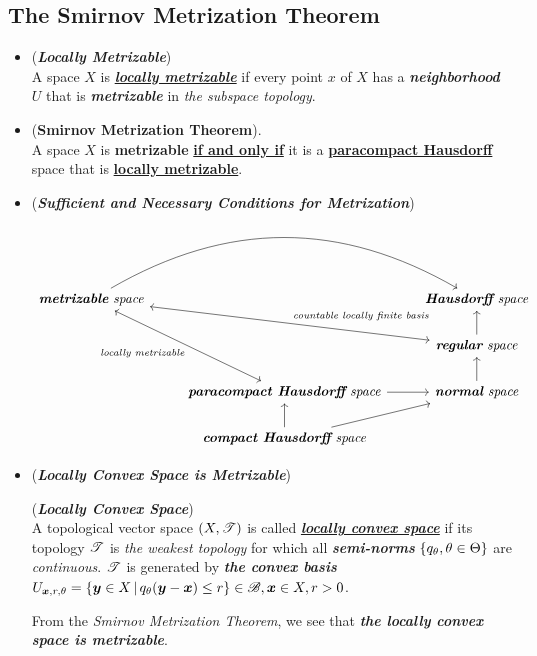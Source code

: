 \documentclass[11pt]{article}
\begin{document}
\subsection{The Smirnov Metrization Theorem}
\begin{itemize}
\item \begin{definition} (\emph{\textbf{Locally Metrizable}})\\
A space $X$ is \underline{\emph{\textbf{locally metrizable}}} if every point $x$ of $X$ has a \emph{\textbf{neighborhood}} $U$ that is \emph{\textbf{metrizable}} in \emph{the subspace topology}.
\end{definition}

\item \begin{theorem} (\textbf{Smirnov Metrization Theorem}).  \citep{munkres2000topology}\\
A space $X$ is \textbf{metrizable} \underline{\textbf{if and only if}} it is a \underline{\textbf{paracompact Hausdorff}} space that is \underline{\textbf{locally metrizable}}.
\end{theorem}

\item 
\begin{remark} (\emph{\textbf{Sufficient and Necessary Conditions for Metrization}})
\[
  \begin{tikzcd}
   \text{\emph{\textbf{metrizable} space}} \arrow[bend left]{rr}{} &  &  \text{\emph{\textbf{Hausdorff} space}} \\
   & &  \arrow[ull, leftrightarrow, swap,  "\text{\emph{countable locally finite basis}}"]   \text{\emph{\textbf{regular} space}}  \arrow{u}{} \\
   & \text{\emph{\textbf{paracompact Hausdorff} space}} \arrow{r}{}  \arrow[uul, leftrightarrow,   "\text{\emph{locally metrizable}}"]   &  \text{\emph{\textbf{normal} space}} \arrow{u}{} \\
   & \text{\emph{\textbf{compact Hausdorff} space}}  \arrow{u}{} \arrow{ru}{} & 
  \end{tikzcd}
\] 
\end{remark}

\item \begin{example} (\emph{\textbf{Locally Convex Space is Metrizable}})
 \begin{definition} (\emph{\textbf{Locally Convex Space}})\\
A topological vector space $(X, {\mathscr T})$ is called \underline{\emph{\textbf{locally convex space}}} if its topology ${\mathscr T}$ is \emph{the weakest topology} for which all \emph{\textbf{semi-norms}} $\left\{q_{\theta},\theta\in \Theta\right\}$ are \emph{continuous}. ${\mathscr T}$ is generated by \emph{\textbf{the convex basis}} $U_{\boldsymbol{x},r,\theta} = \left\{\boldsymbol{y}\in X\,|\, q_{\theta}(\boldsymbol{y}-\boldsymbol{x}) \le r \right\}\in {\mathscr B}, \boldsymbol{x}\in X, r>0$. 
\end{definition}

From the \emph{Smirnov Metrization Theorem}, we see that \emph{\textbf{the locally convex space is metrizable}}.
\end{example}

\end{itemize}
\newpage


\end{document}
